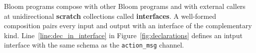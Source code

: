 Bloom programs compose with other Bloom programs and with external callers at unidirectional
\textbf{scratch} collections called \textbf{interfaces}.  A well-formed composition pairs
every input and output with an interface of the complementary kind.  Line~\ref{line:dec_in_interface} in 
Figure~\ref{fig:declarations} defines an intput interface with the same schema as the \texttt{action\_msg}
channel.

\begin{comment}
\begin{figure}[t]
\begin{scriptsize}
\begin{verbatim}
 1      class SimplePQueue < Bud
 2      def state
 3        table :q, ['id'], ['payload']
 4        table :min_id, ['id']
 5        table :log, ['id'], ['payload']
 6        scratch :newmins, ['id'], ['payload']
 7        channel :output, 0, ['addr', 'id'], ['payload']
 8      end
 9    
10      declare
11      def dequeue
12        # find min_id value, agg across all items (group=nil)
13        min_id <= q.group(nil, min(q.id))
14    
15        # find the q items with min_id via natural join
16        mins = natjoin [q, min_id] {|q, m| q }
17    
18        # idempotence: ignore items with id previously logged
19        newmins <= mins.map do |q| 
20          q unless log.map{|p| p.id}.include? q.id
21        end
22
23        # in the next timestep, add newmins to log, delete from q
24        log <+ newmins.map{|h| [h.id]}
25        q <- mins.map {|q| q}
26      
27        # ship the min items via the output channel
28        output <+ mins.map{|q| ['192.168.1.1:12345'] + q}
29      end
30    end
\end{verbatim}
\vspace{-10pt}
\caption{Example Bloom code for dequeuing items from a priority queue.}
\label{fig:queue}
\end{scriptsize}
\vspace{-2pt}
\end{figure}

\end{comment}


